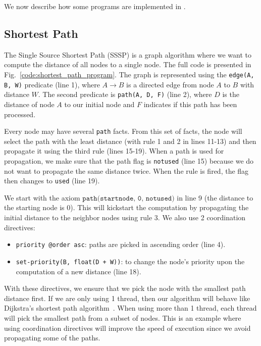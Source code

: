 We now describe how some programs are implemented in \lang.
\begin{comment}
We will present a graph algorithm
(single source shortest path), a machine learning algorithm (splash belief propagation) and a logic puzzle (N queens).
\end{comment}

\subsection{Shortest Path}

The Single Source Shortest Path (SSSP) is a graph algorithm where we want to compute the
distance of all nodes to a single node. The full code is presented in Fig.~\ref{code:shortest_path_program}.
The graph is represented using the \texttt{edge(A, B, W)} predicate (line 1), where $A \rightarrow B$ is a directed edge
from node $A$ to $B$ with distance $W$. The second
predicate is \texttt{path(A, D, F)} (line 2), where $D$ is the distance of node $A$ to our initial node and $F$
indicates if this path has been processed.

Every node may have several \texttt{path} facts. From this set of facts, the node will select
the path with the least distance (with rule 1 and 2 in lines 11-13) and then propagate it using the third rule (lines 15-19).
When a path is used for propagation, we make sure that the path flag is \texttt{notused} (line 15)
because we do not want to propagate the same distance twice. When the rule is fired, the flag
then changes to \texttt{used} (line 19).

We start with the axiom $\texttt{path(startnode, 0, notused)}$ in line 9 (the distance to the starting node is 0).
This will kickstart the computation by propagating the initial distance to the neighbor nodes using
rule 3. We also use 2 coordination directives:

\begin{itemize}
   \item \texttt{priority @order asc}: paths are picked in ascending order (line 4).
   \item \texttt{set-priority(B, float(D + W))}: to change the node's priority upon the computation of
a new distance (line 18).
\end{itemize}

With these directives, we ensure that we pick the node with the smallest path distance
first. If we are only using 1 thread, then our algorithm will behave like Dijkstra's shortest
path algorithm~\cite{Dijkstra}. When using more than 1 thread, each thread will pick the smallest
path from a subset of nodes. This is an example where using coordination directives will
improve the speed of execution since we avoid propagating some of the paths.


